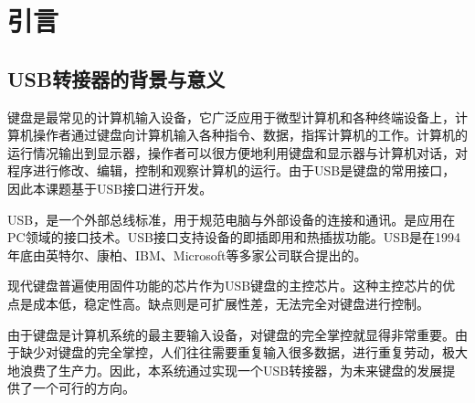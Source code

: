 
\chapter{引言}
\section{USB转接器的背景与意义}

键盘是最常见的计算机输入设备，它广泛应用于微型计算机和各种终端设备上，计算机操作者通过键盘向计算机输入各种指令、数据，指挥计算机的工作。计算机的运行情况输出到显示器，操作者可以很方便地利用键盘和显示器与计算机对话，对程序进行修改、编辑，控制和观察计算机的运行。由于USB是键盘的常用接口，因此本课题基于USB接口进行开发。

\gls{USB}，是一个外部总线标准，用于规范电脑与外部设备的连接和通讯。是应用在PC领域的接口技术。USB接口支持设备的即插即用和热插拔功能。\gls{USB}是在1994年底由英特尔、康柏、IBM、Microsoft等多家公司联合提出的。

现代键盘普遍使用固件功能的芯片作为USB键盘的主控芯片。这种主控芯片的优点是成本低，稳定性高。缺点则是可扩展性差，无法完全对键盘进行控制。

由于键盘是计算机系统的最主要输入设备，对键盘的完全掌控就显得非常重要。由于缺少对键盘的完全掌控，人们往往需要重复输入很多数据，进行重复劳动，极大地浪费了生产力。因此，本系统通过实现一个USB转接器，为未来键盘的发展提供了一个可行的方向。


